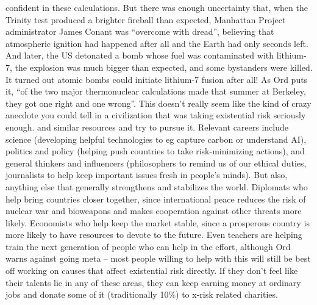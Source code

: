 \begin{xmlentries}
\begin{xmlentriescontent}
{   confident in these calculations. But there was enough uncertainty that, when the Trinity test produced a brighter fireball than expected, Manhattan Project administrator James Conant was “overcome with dread”, believing that atmospheric ignition had happened after all and the Earth had only seconds left. And later, the US detonated a bomb whose fuel was contaminated with lithium-7, the explosion was much bigger than expected, and some bystanders were killed. It turned out atomic bombs could initiate lithium-7 fusion after all! As Ord puts it, “of the two major thermonuclear calculations made that summer at Berkeley, they got one right and one wrong”. This doesn’t really seem like the kind of crazy anecdote you could tell in a civilization that was taking existential risk seriously enough.
   and similar resources and try to pursue it. Relevant careers include science (developing helpful technologies to eg capture carbon or understand AI), politics and policy (helping push countries to take risk-minimizing actions), and general thinkers and influencers (philosophers to remind us of our ethical duties, journalists to help keep important issues fresh in people’s minds). But also, anything else that generally strengthens and stabilizes the world. Diplomats who help bring countries closer together, since international peace reduces the risk of nuclear war and bioweapons and makes cooperation against other threats more likely. Economists who help keep the market stable, since a prosperous country is more likely to have resources to devote to the future. Even teachers are helping train the next generation of people who can help in the effort, although Ord warns against going   meta – most people willing to help with this will still be best off working on causes that affect existential risk directly. If they don’t feel like their talents lie in any of these areas, they can keep earning money at ordinary jobs and donate some of it (traditionally 10\%) to x-risk related charities.
}
\end{xmlentriescontent}
\end{xmlentries}
